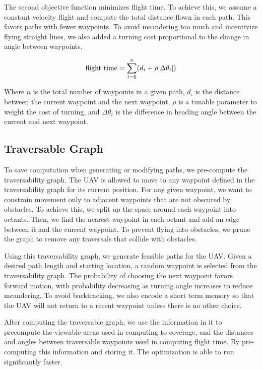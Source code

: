 \documentclass[letterpaper, 10 pt, conference]{ieeeconf}  %
\begin{document}
The second objective function minimizes flight time. To achieve this, we assume a constant velocity flight and compute the total distance flown in each path. This favors paths with fewer waypoints. To avoid meandering too much and incentivize flying straight lines, we also added a turning cost proportional to the change in angle between waypoints.

\begin{equation}%
    \text{flight time} = \sum_{i=0}^{n} (d_i + \rho\abs{\Delta \theta_i})
\end{equation}

Where $n$ is the total number of waypoints in a given path, $d_i$ is the distance between the current waypoint and the next waypoint, $\rho$ is a tunable parameter to weight the cost of turning, and $\Delta \theta_i$ is the difference in heading angle between the current and next waypoint.

\subsection{Traversable Graph}

To save computation when generating or modifying paths, we pre-compute the traversability graph. The UAV is allowed to move to any waypoint defined in the traversability graph for its current position. For any given waypoint, we want to constrain movement only to adjacent waypoints that are not obscured by obstacles. To achieve this, we split up the space around each waypoint into octants. Then, we find the nearest waypoint in each octant and add an edge between it and the current waypoint. To prevent flying into obstacles, we prune the graph to remove any traversals that collide with obstacles.

Using this traversability graph, we generate feasible paths for the UAV. Given a desired path length and starting location, a random waypoint is selected from the traversability graph. The probability of choosing the next waypoint favors forward motion, with probability decreasing as turning angle increases to reduce meandering. To avoid backtracking, we also encode a short term memory so that the UAV will not return to a recent waypoint unless there is no other choice.

After computing the traversable graph, we use the information in it to precompute the viewable areas used in computing to coverage, and the distances and angles between traversable waypoints used in computing flight time. By pre-computing this information and storing it. The optimization is able to run significantly faster.
\end{document}
